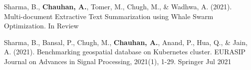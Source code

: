 



\begin{publications}

  \publication
    {} %
    {Sharma, B., \textbf{Chauhan, A.}, Tomer, M., Chugh, M., \& Wadhwa, A. (2021). Multi-document Extractive Text Summarization using Whale Swarm Optimization.} %
    {} %
    {In Review} %

  \publication
    {} %
    {Sharma, B., Bansal, P., Chugh, M., \textbf{Chauhan, A.}, Anand, P., Hua, Q., \& Jain, A. (2021). Benchmarking geospatial database on Kubernetes cluster. EURASIP Journal on Advances in Signal Processing, 2021(1), 1-29.} %
    {Springer} %
    {Jul 2021} %

\end{publications}
